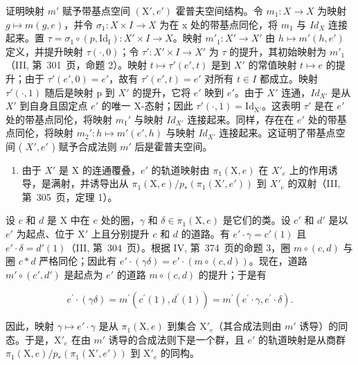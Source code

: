 证明映射 \(m'\) 赋予带基点空间 \((\mathrm{X}', e')\) 霍普夫空间结构。令 \(m_1 \colon X \to X\) 为映射 \(g \mapsto m(g, e)\)，并令 \(\sigma_1 \colon X \times I \to X\) 为在 x 处的带基点同伦，将 \(m_1\) 与 \(Id_X\) 连接起来。置 \(\tau = \sigma_1 \circ (p, \mathrm{Id_I}) \colon X' \times I \to X\)。映射 \(m'_1 \colon X' \to X'\) 由 \(h \mapsto m'(h, e')\) 定义，并提升映射 \(\tau(\cdot, 0)\)；令 \(\tau' \colon X' \times I \to X'\) 为 \(\tau\) 的提升，其初始映射为 \(m'_1\)（III, 第~301~页，命题 2）。映射 \(t \mapsto \tau'(e', t)\) 是到 \(X'\) 的常值映射 \(t \mapsto e\) 的提升；由于 \(\tau'(e', 0) = e'\)，故有 \(\tau'(e', t) = e'\) 对所有 \(t \in I\) 都成立。映射 \(\tau'(\cdot, 1)\) 随后是映射 p 到 \(X'\) 的提升，它将 \(e'\) 映到 \(e'\)。由于 \(X'\) 连通，\(Id_{X'}\) 是从 \(X'\) 到自身且固定点 \(e'\) 的唯一 X-态射；因此 \(\tau'(\cdot,1)=\mathrm{Id}_{\mathrm{X}'}\)。这表明 \(\tau'\) 是在 \(e'\) 处的带基点同伦，将映射 \(m_{1}'\) 与映射 \(Id_{X'}\) 连接起来。同样，存在在 \(e'\) 处的带基点同伦，将映射 \(m_{2}'\colon h\mapsto m'(e',h)\) 与映射 \(Id_{X'}\) 连接起来。这证明了带基点空间 ( \(X',e'\) ) 赋予合成法则 \(m'\) 后是霍普夫空间。

\begin{enumerate}
\def\labelenumi{\alph{enumi})}
\setcounter{enumi}{2}
\tightlist
\item
  由于 \(X'\) 是 X 的连通覆叠，\(e'\) 的轨道映射由 \(\pi_{1}(\mathrm{X},e)\) 在 \(X'_{e}\) 上的作用诱导，是满射，并诱导出从 \(\pi_{1}(\mathrm{X},e)/p_{*}(\pi_{1}(\mathrm{X}',e'))\) 到 \(X'_{e}\) 的双射（III, 第~305~页，定理 1）。
\end{enumerate}

设 \(c\) 和 \(d\) 是 X 中在 \(e\) 处的圈，\(\gamma\) 和 \(\delta \in \pi_1(\mathrm{X},e)\) 是它们的类。设 \(c'\) 和 \(d'\) 是以 \(e'\) 为起点、位于 \(\mathrm{X}'\) 上且分别提升 \(c\) 和 \(d\) 的道路。有 \(e' \cdot \gamma = c'(1)\) 且 \(e' \cdot \delta = d'(1)\)（III, 第~304~页）。根据 IV, 第~374~页的命题 3，圈 \(m \circ (c,d)\) 与圈 \(c*d\) 严格同伦；因此有 \(e' \cdot (\gamma\delta) = e' \cdot (m \circ (c,d))\)。现在，道路 \(m' \circ (c',d')\) 是起点为 \(e'\) 的道路 \(m \circ (c,d)\) 的提升；于是有

\[
e ^ {\prime} \cdot (\gamma \delta) = m ^ {\prime} (c ^ {\prime} (1), d ^ {\prime} (1)) = m ^ {\prime} (e ^ {\prime} \cdot \gamma , e ^ {\prime} \cdot \delta).
\]

因此，映射 \(\gamma \mapsto e' \cdot \gamma\) 是从 \(\pi_1(\mathrm{X}, e)\) 到集合 \(\mathrm{X}'_e\)（其合成法则由 \(m'\) 诱导）的同态。于是，\(\mathrm{X}'_e\) 在由 \(m'\) 诱导的合成法则下是一个群，且 \(e'\) 的轨道映射是从商群 \(\pi_1(\mathrm{X}, e)/p_*(\pi_1(\mathrm{X}', e'))\) 到 \(\mathrm{X}'_e\) 的同构。

